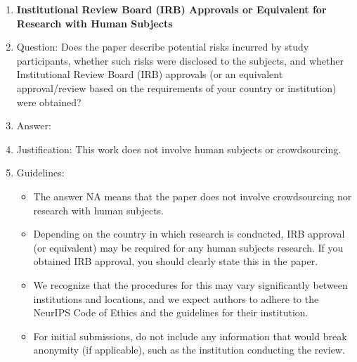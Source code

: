 \documentclass{article}
\begin{document}
\begin{enumerate}
\item {\bf Institutional Review Board (IRB) Approvals or Equivalent for Research with Human Subjects}
    \item[] Question: Does the paper describe potential risks incurred by study participants, whether such risks were disclosed to the subjects, and whether Institutional Review Board (IRB) approvals (or an equivalent approval/review based on the requirements of your country or institution) were obtained?
    \item[] Answer: \answerNA{} %
    \item[] Justification: This work does not involve human subjects or crowdsourcing.
    \item[] Guidelines:
    \begin{itemize}
        \item The answer NA means that the paper does not involve crowdsourcing nor research with human subjects.
        \item Depending on the country in which research is conducted, IRB approval (or equivalent) may be required for any human subjects research. If you obtained IRB approval, you should clearly state this in the paper. 
        \item We recognize that the procedures for this may vary significantly between institutions and locations, and we expect authors to adhere to the NeurIPS Code of Ethics and the guidelines for their institution. 
        \item For initial submissions, do not include any information that would break anonymity (if applicable), such as the institution conducting the review.
    \end{itemize}

\end{enumerate}
\end{document}

